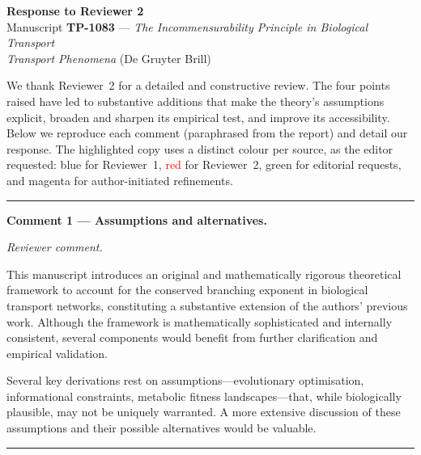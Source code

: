 \documentclass[11pt]{article}
\newcommand{\rtwo}[1]{\textcolor{red}{#1}}
\newenvironment{comment}%
  {\par\medskip\noindent\itshape\color{black!75} Reviewer comment.\par\nobreak}%
  {\par\nobreak\noindent\rule{\linewidth}{0.4pt}\medskip}
\begin{document}
\begin{center}
{\large\bfseries Response to Reviewer 2}\\[4pt]
Manuscript \textbf{TP-1083} --- \emph{The Incommensurability Principle in
Biological Transport}\\
\emph{Transport Phenomena} (De Gruyter Brill)
\end{center}

\bigskip
\noindent We thank Reviewer~2 for a detailed and constructive review. The four
points raised have led to substantive additions that make the theory's
assumptions explicit, broaden and sharpen its empirical test, and improve its
accessibility. Below we reproduce each comment (paraphrased from the report) and
detail our response. The highlighted copy uses a distinct colour per source, as
the editor requested: blue for Reviewer~1, \rtwo{red} for Reviewer~2, green for
editorial requests, and magenta for author-initiated refinements.

\bigskip
\hrule
\bigskip

\noindent\textbf{Comment 1 --- Assumptions and alternatives.}
\begin{comment}
This manuscript introduces an original and mathematically rigorous theoretical
framework to account for the conserved branching exponent in biological
transport networks, constituting a substantive extension of the authors'
previous work. Although the framework is mathematically sophisticated and
internally consistent, several components would benefit from further
clarification and empirical validation.

Several key derivations rest on assumptions---evolutionary optimisation,
informational constraints, metabolic fitness landscapes---that, while
biologically plausible, may not be uniquely warranted. A more extensive
discussion of these assumptions and their possible alternatives would be
valuable.
\end{comment}
\end{document}
